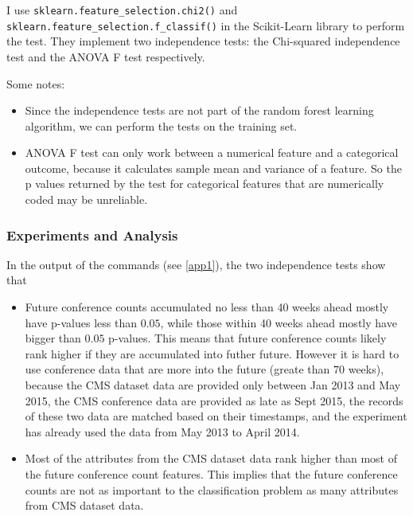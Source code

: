 \documentclass[final, 12pt]{elsarticle}
\begin{document}
I use \verb|sklearn.feature_selection.chi2()| and \verb|sklearn.feature_selection.f_classif()| in the Scikit-Learn library to perform the test.
They implement two independence tests: the Chi-squared independence test and the ANOVA F test respectively.

Some notes:

\begin{itemize}

  \item Since the independence tests are not part of the random forest learning algorithm, we can perform the tests on the training set.

  \item ANOVA F test can only work between a numerical feature and a categorical outcome, because it calculates sample mean and variance of a feature.
So the p values returned by the test for categorical features that are numerically coded may be unreliable.


\end{itemize}


\subsubsection{Experiments and Analysis}
 
In the output of the commands (see \ref{app1}),
the two independence tests show that

\begin{itemize}

  \item
Future conference counts accumulated no less than 40 weeks ahead mostly have p-values less than $0.05$,
while those within 40 weeks ahead mostly have bigger than $0.05$ p-values.
This means that future conference counts likely rank higher if they are accumulated into futher future.
However it is hard to use conference data that are more into the future (greate than $70$ weeks), because the CMS dataset data are provided only between Jan 2013 and May 2015, the CMS conference data are provided as late as Sept 2015, the records of these two data are matched based on their timestamps, and the experiment has already used the data from May 2013 to April 2014.

\item
  Most of the attributes from the CMS dataset data rank higher than most of the future conference count features.
This implies that the future conference counts are not as important to the classification problem as many attributes from CMS dataset data.

 \end{itemize} 
\end{document}
